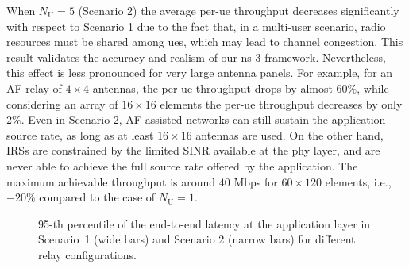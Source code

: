 When $N_{\mathrm U}=5$ (Scenario 2) the average per-\gls{ue} throughput decreases significantly with respect to Scenario 1 due to the fact that, in a multi-user scenario, radio resources must be shared among \glspl{ue}, which may lead to channel congestion. This result validates the accuracy and realism of our ns-3 framework.
 Nevertheless, this effect is less pronounced for very large antenna panels. For example, for an AF relay of $4\times4$ antennas, the per-\gls{ue} throughput drops by almost $60\%$, while considering an array of $16\times16$ elements the per-\gls{ue} throughput decreases by only $2\%$.
Even in Scenario 2, AF-assisted networks can still sustain the application source rate, as long as at least $16\times16$ antennas are used.
On the other hand, IRSs are constrained by the limited SINR available at the \gls{phy} layer, and are never able to achieve the full source rate offered by the application. The maximum achievable throughput is around $40$ Mbps for $60\times120$ elements, i.e., $-20$\% compared to the case of $N_{\mathrm U}=1$.





\begin{figure}
	\centering
	\setlength{}
	\setlength{}
	
	\caption{95-th percentile of the end-to-end latency at the application layer in Scenario~1 (wide bars) and Scenario 2 (narrow bars) for different relay configurations.}
	\label{fig:latency}
\end{figure}


